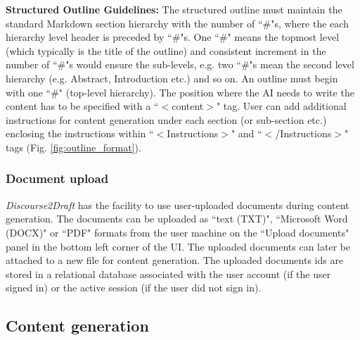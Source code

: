 \documentclass[utf8]{FrontiersinHarvard} %
\newcommand{\appname}{\emph{Discourse2Draft}}
\begin{document}
\textbf{Structured Outline Guidelines:} The structured outline must maintain the standard Markdown section hierarchy with the number of ``\#"s, where the each hierarchy level header is preceded by ``\#"s. One ``\#" means the topmost level (which typically is the title of the outline) and consistent increment in the number of ``\#"s would ensure the sub-levels, e.g. two ``\#"s mean the second level hierarchy (e.g. Abstract, Introduction etc.) and so on. An outline must begin with one ``\#" (top-level hierarchy). The position where the AI needs to write the content has to be specified with a ``$<$content$>$" tag. User can add additional instructions for content generation under each section (or sub-section etc.) enclosing the instructions within ``$<$Instructions$>$" and ``$<$/Instructions$>$" tags (Fig. \ref{fig:outline_format}).



\subsubsection{Document upload}
\appname{} has the facility to use user-uploaded documents during content generation. The documents can be uploaded as ``text (TXT)", ``Microsoft Word (DOCX)" or ``PDF" formats from the user machine on the ``Upload documents" panel in the bottom left corner of the UI. The uploaded documents can later be attached to a new file for content generation. The uploaded documents ids are stored in a relational database associated with the user account (if the user signed in) or the active session (if the user did not sign in).

\subsection{Content generation}
\end{document}
